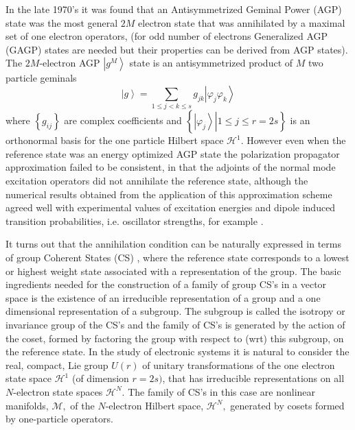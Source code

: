 \documentclass[12pt,aps,amsfonts,amssymb,tightenlines]{revtex4}%
\begin{document}
In the late 1970's it was found \cite{Weiner80}\cite{Weiner80a}%
\cite{Goscinski80}\cite{Linderberg77}\cite{Ohrn79} that an Antisymmetrized
Geminal Power (AGP) \cite{Coleman63} state was the most general $2M$ electron
state that was annihilated by a maximal set of one electron operators, (for
odd number of electrons Generalized AGP (GAGP) states \cite{Coleman65} are
needed but their properties can be derived from AGP states). The $2M$-electron
AGP $\left\vert g^{M}\right\rangle $ state is an antisymmetrized product of
$M$ two particle geminals
\begin{equation}
\left\vert g\right\rangle =\sum_{1\leq j<k\leq s}g_{jk}\left\vert \varphi
_{j}\varphi_{k}\right\rangle
\end{equation}
where $\left\{  g_{ij}\right\}  $ are complex coefficients and $\left\{
\left.  \left\vert \varphi_{j}\right\rangle \right\vert 1\leq j\leq
r=2s\right\}  $ is an orthonormal basis for the one particle Hilbert space
$\mathcal{H}^{1}.$ However even when the reference state was an energy
optimized AGP state the polarization propagator approximation failed to be
consistent, in that the adjoints of the normal mode excitation operators did
not annihilate the reference state, although the numerical results obtained
from the application of this approximation scheme agreed well with
experimental values of excitation energies and dipole induced transition
probabilities, i.e. oscillator strengths, for example \cite{Sangfelt85}%
\cite{Sangfelt84}\cite{Elander83}\cite{Goscinski82}\cite{Weiner83}%
\cite{Sangfelt81} \cite{Weiner87}\cite{Sangfelt87}\cite{Ohrn85}\cite{Weiner85}%
\cite{Weiner84a}\cite{Jensen82}\cite{Jorgen83}.

It turns out that the annihilation condition can be naturally expressed in
terms of group Coherent States (CS) \cite{Perelomov_book}\cite{Klauder}%
\cite{Gilmore_book}, where the reference state corresponds to a lowest or
highest weight state associated with a representation of the group. The basic
ingredients needed for the construction of a family of group CS's in a vector
space is the existence of an irreducible representation of a group and a one
dimensional representation of a subgroup. The subgroup is called the isotropy
or invariance group of the CS's and the family of CS's is generated by the
action of the coset, formed by factoring the group with respect to (wrt) this
subgroup, on the reference state. In the study of electronic systems it is
natural to consider the real, compact, \cite{Encyclo} Lie group $U(r)$ of
unitary transformations of the one electron state space $\mathcal{H}^{1}$ (of
dimension $r=2s)$, that has irreducible representations on all $N$-electron
state spaces $\mathcal{H}^{N}$. The family of CS's in this case are nonlinear
manifolds, $\mathcal{M},$ of the $N$-electron Hilbert space, $\mathcal{H}%
^{N},$ generated by cosets formed by one-particle operators.
\end{document}
